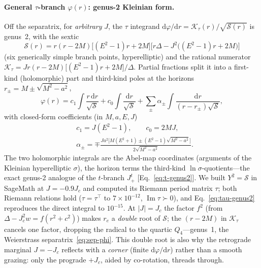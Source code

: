 \documentclass[
    aps, prd, twocolumn, superscriptaddress,
    showpacs, nofootinbib, floatfix
]{revtex4-2}
\newcommand{\Jc}{J_{c}}
\newcommand{\dd}{\mathrm{d}}
\begin{document}
\paragraph{General $\tau$-branch $\varphi(r)$: genus-2 Kleinian form.} Off the
separatrix, for \emph{arbitrary} $J$, the $\tau$ integrand
$\dd\varphi/\dd r=\mathcal K_\tau(r)/\sqrt{\mathcal S(r)}$ is genus~2, with the
sextic
\begin{equation}
    \mathcal S(r)=r(r-2M)\big[(E^2-1)r+2M\big]
      \big[r\Delta-J^2\big((E^2-1)r+2M\big)\big]
    \label{eq:tau-sextic}
\end{equation}
(six generically simple branch points, hyperelliptic) and the rational numerator
$\mathcal K_\tau=Jr(r-2M)\big[(E^2-1)r+2M\big]/\Delta$. Partial fractions split it
into a first-kind (holomorphic) part and third-kind poles at the horizons
$r_\pm=M\pm\sqrt{M^2-a^2}$,
\begin{equation}
    \varphi(r)=c_1\!\int\!\frac{r\,\dd r}{\sqrt{\mathcal S}}
      +c_0\!\int\!\frac{\dd r}{\sqrt{\mathcal S}}
      +\sum_{\pm}\alpha_\pm\!\int\!\frac{\dd r}{(r-r_\pm)\sqrt{\mathcal S}},
    \label{eq:tau-genus2}
\end{equation}
with closed-form coefficients (in $M,a,E,J$)
\begin{equation}
\begin{aligned}
    &c_1=J(E^2-1),\qquad c_0=2MJ,\\
    &\alpha_\pm=\mp\frac{Ja^2\big[M(E^2+1)\pm(E^2-1)\sqrt{M^2-a^2}\big]}
      {2\sqrt{M^2-a^2}}.
\end{aligned}
    \label{eq:tau-coeffs}
\end{equation}
The two holomorphic integrals are the Abel-map coordinates (arguments of the
Kleinian hyperelliptic $\sigma$), the horizon terms the third-kind
$\ln\sigma$-quotients---the exact genus-2 analogue of the $t$-branch $J_+^t$
[Eq.~\eqref{eq:t-genus2}]. We built $Y^2=\mathcal S$ in SageMath at $J=-0.9\Jc$
and computed its Riemann period matrix $\tau$; both Riemann relations hold
($\tau=\tau^\top$ to $7\times10^{-12}$, $\operatorname{Im}\tau\succ0$), and
Eq.~\eqref{eq:tau-genus2} reproduces the direct integral to $10^{-15}$. At
$|J|=\Jc$ the factor $f^2$ (from $\Delta-\Jc^2w=f(r^2+c^2)$) makes $r_e$ a
\emph{double} root of $\mathcal S$; the $(r-2M)$ in $\mathcal K_\tau$ cancels one
factor, dropping the radical to the quartic $Q_4$---genus~1, the Weierstrass
separatrix~\eqref{eq:sep-phi}. This double root is also why the retrograde
marginal $J=-\Jc$ reflects with a \emph{corner} (finite $\dd\varphi/\dd r$)
rather than a smooth grazing: only the prograde $+\Jc$, aided by co-rotation,
threads through.
\end{document}
